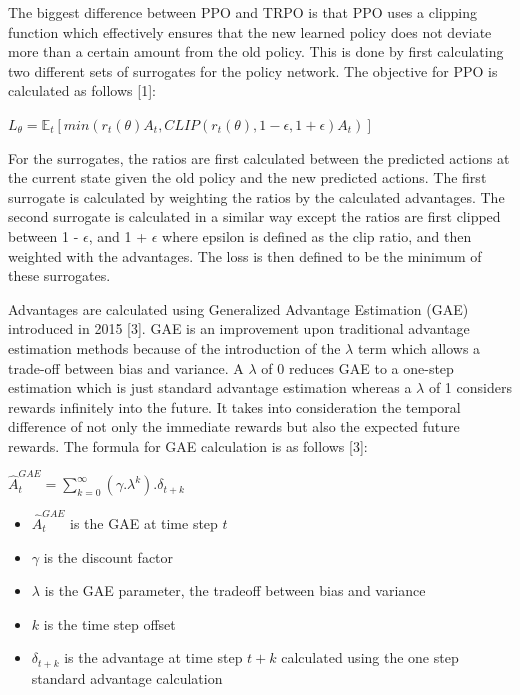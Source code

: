 \documentclass{article}
\begin{document}
    The biggest difference between PPO and TRPO is that PPO uses a clipping function which effectively ensures that the new learned policy does not deviate more than a certain amount from the old policy. This is done by first calculating two different sets of surrogates for the policy network. The objective for PPO is calculated as follows [1]:
    
    \begin{center}
        $L_{\theta} = \mathbb{E}_{t}[min(r_{t}({\theta})A_{t}, CLIP(r_{t}({\theta}), 1-\epsilon, 1+\epsilon)A_{t})]$
    \end{center}
    
    For the surrogates, the ratios are first calculated between the predicted actions at the current state given the old policy and the new predicted actions. The first surrogate is calculated by weighting the ratios by the calculated advantages. The second surrogate is calculated in a similar way except the ratios are first clipped between 1 - $\epsilon$, and 1 + $\epsilon$ where epsilon is defined as the clip ratio, and then weighted with the advantages. The loss is then defined to be the minimum of these surrogates.
    
    Advantages are calculated using Generalized Advantage Estimation (GAE) introduced in 2015 [3]. GAE is an improvement upon traditional advantage estimation methods because of the introduction of the $\lambda$ term which allows a trade-off between bias and variance. A $\lambda$ of 0 reduces GAE to a one-step estimation which is just standard advantage estimation whereas a $\lambda$ of 1 considers rewards infinitely into the future. It takes into consideration the temporal difference of not only the immediate rewards but also the expected future rewards. The formula for GAE calculation is as follows [3]:
    
    \begin{center}
        $\hat{A}^{GAE}_{t} = \sum_{k=0}^{\infty}(\gamma.\lambda^{k}).\delta_{t+k}$
    \end{center}
    \begin{itemize}
        \item $\hat{A}^{GAE}_{t}$ is the GAE at time step $t$
        \item $\gamma$ is the discount factor
        \item $\lambda$ is the GAE parameter, the tradeoff between bias and variance
        \item $k$ is the time step offset
        \item $\delta_{t+k}$ is the advantage at time step $t+k$ calculated using the one step standard advantage calculation
    \end{itemize}
    
\end{document}
